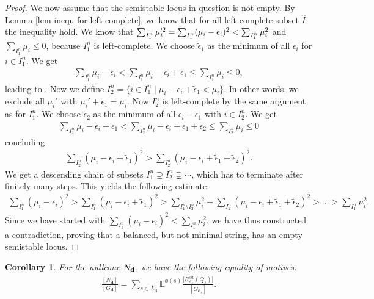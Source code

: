 \documentclass[pdftex]{sigma}
\numberwithin{equation}{section}
\newtheorem{Corollary}[Theorem]{Corollary}
\theoremstyle{definition}
\begin{document}
\begin{proof}
We now assume that the semistable locus in question is not empty.
By Lemma \ref{lem inequ for left-complete}, we know that for all left-complete subset $\hat{I}$ the inequality  hold.
We know that $\smash{\sum_{I^n_1} \mu_i'^2} = \sum_{I^n_1} (\mu_i - \epsilon_i)^2 < \sum_{I^n_1} \mu_i^2$ and $\sum_{I^n_1} \mu_i \leq 0$, because $I^n_1$ is left-complete. We choose $\tilde{\epsilon}_1$ as the minimum of all $\epsilon_i$ for $i \in I^n_1$. We get
\begin{align*}
\sum_{I^n_1} \mu_i -\epsilon_i < \sum_{I^n_1} \mu_i - \epsilon_i + \tilde{\epsilon}_1 \leq \sum_{I^n_1} \mu_i \leq 0 ,
\end{align*}
leading to .
Now we define
$
I^n_2 = \{i \in I^n_1 \mid \mu_i -\epsilon_i + \tilde{\epsilon}_1 < \mu_i\} $.
In other words, we exclude all $\mu_i'$ with $\mu_i' + \tilde{\epsilon}_1 = \mu_i$.
Now $I^n_2$ is left-complete by the same argument as for $I^n_1$. We choose $\tilde{\epsilon}_2$ as the minimum of all $\epsilon_i - \tilde{\epsilon}_1$ with $i \in I^n_2$. We get
\begin{align*}
\sum_{I^n_2} \mu_i - \epsilon_i +\tilde{\epsilon}_1 < \sum_{I^n_2} \mu_i - \epsilon_i+ \tilde{\epsilon}_1 + \tilde{\epsilon}_2 \leq \sum_{I^n_2} \mu_i \leq 0
\end{align*}
concluding
\begin{align*}
\sum_{I^n_2} (\mu_i - \epsilon_i + \tilde{\epsilon}_1)^2 > \sum_{I^n_2} (\mu_i - \epsilon_i + \tilde{\epsilon}_1 + \tilde{\epsilon}_2)^2.
\end{align*}
We get a descending chain of subsets
$
I_1^n \supsetneq I_2^n \supsetneq \cdots$,
which has to terminate after finitely many steps. This yields the following estimate:
\begin{align*}
\sum_{I^n_1} (\mu_i -\epsilon_i)^2 > \sum_{I^n_1} (\mu_i - \epsilon_i + \tilde{\epsilon}_1)^2 > \sum_{I^n_1 \setminus I^n_2} \mu_i^2 + \sum_{I^n_2} (\mu_i - \epsilon_i + \tilde{\epsilon}_1 + \tilde{\epsilon}_2)^2 > \dots > \sum_{I^n_1} \mu_i^2 .
\end{align*}
Since we have started with $\sum_{I^n_1} (\mu_i -\epsilon_i)^2 < \sum_{I^n_1} \mu_i^2$, we have thus constructed a contradiction, proving that a balanced, but not minimal string, has an empty semistable locus.
\end{proof}

\begin{Corollary}
 For the nullcone $N_{\bf d}$, we have the following equality of motives:
 \begin{align*}
 \frac{[ N_{\mathbf{d}}]}{[ G_{\mathbf{d}}]} = \sum_{s \in {\overline{L}_{\mathbf{d}}}} \mathbb{L}^{\phi(s)} \frac{\big[R^{\mathrm{sst}}_{\mathbf{d}_s}(Q_s)\big]}{[G_{\mathbf{d}_s}]} .
 \end{align*}
\end{Corollary}
\end{document}
